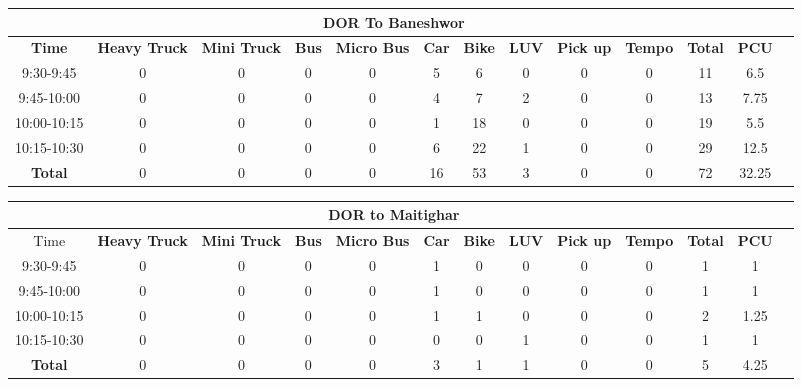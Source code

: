 \begin{landscape}
\centering
\begin{table}[h!]
\centering
\begin{tabular}{|c|c|c|c|c|c|c|c|c|c|c|c|c|}
    \hline
    \multicolumn{12}{|c|}{\textbf{DOR To Baneshwor}} \\
    \hline
    \textbf{Time} & \textbf{Heavy Truck} & \textbf{Mini Truck} & \textbf{Bus} & \textbf{Micro Bus} & \textbf{Car} & \textbf{Bike} & \textbf{LUV} & \textbf{Pick up} & \textbf{Tempo} & \textbf{\textbf{Total}} & \textbf{PCU} \\
    \hline
9:30-9:45	&0	&0	&0	&0	&5	&6	&0	&0	&0	&11	&6.5 \\ \hline
9:45-10:00	&0	&0	&0	&0	&4	&7	&2	&0	&0	&13	&7.75 \\ \hline
10:00-10:15	&0	&0	&0	&0	&1	&18	&0	&0	&0	&19	&5.5 \\ \hline
10:15-10:30	&0	&0	&0	&0	&6	&22	&1	&0	&0	&29	&12.5 \\ \hline
\textbf{Total}	&0	&0	&0	&0	&16	&53	&3	&0	&0	&72	&32.25 \\ \hline




\end{tabular}

\vspace{0.5cm}

\begin{tabular}{|c|c|c|c|c|c|c|c|c|c|c|c|c|}
    \hline
    \multicolumn{12}{|c|}{\textbf{DOR to Maitighar}} \\
    \hline
        Time & \textbf{Heavy Truck} & \textbf{Mini Truck} & \textbf{Bus} & \textbf{Micro Bus} & \textbf{Car} & \textbf{Bike} & \textbf{LUV} & \textbf{Pick up} & \textbf{Tempo} & \textbf{\textbf{Total}} & \textbf{PCU} \\
    \hline
9:30-9:45	&0	&0	&0	&0	&1	&0	&0	&0	&0	&1	&1 \\ \hline
9:45-10:00	&0	&0	&0	&0	&1	&0	&0	&0	&0	&1	&1 \\ \hline
10:00-10:15	&0	&0	&0	&0	&1	&1	&0	&0	&0	&2	&1.25 \\ \hline
10:15-10:30	&0	&0	&0	&0	&0	&0	&1	&0	&0	&1	&1 \\ \hline
\textbf{Total}	&0	&0	&0	&0	&3	&1	&1	&0	&0	&5	&4.25 \\ \hline



\end{tabular}


\end{table}
\end{landscape}
